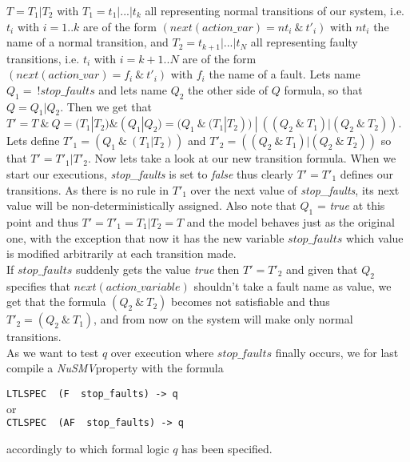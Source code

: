 \documentclass[12pt]{article}
\newcommand{\nusmv}{\mbox{\textit{NuSMV}}}
\begin{document}
$T = T_1 | T_2$ with $T_1 = t_1 | ... | t_k$ all representing normal transitions of our system, i.e. $t_i$ with $i=1..k$ are of the form $(next(action\_var) = nt_i~\&~t'_i)$ with $nt_i$ the name of a normal transition, and $T_2 = t_{k+1} | ... | t_N$ all representing faulty transitions, i.e. $t_i$ with $i=k+1..N$ are of the form $(next(action\_var) = f_i~\&~t'_i)$ with $f_i$ the name of a fault. Lets name $Q_1 =~!stop\_faults$ and lets name $Q_2$ the other side of $Q$ formula, so that $Q = Q_1 | Q_2$.
Then we get that $T' = T ~\&~ Q = (T_1|T_2) \& (Q_1|Q_2) = (Q_1~\&~(T_1|T_2)) ~|~ ((Q_2~\&~T_1) | (Q_2~\&~T_2))$. Lets define $T'_1 = (Q_1~\&~(T_1|T_2))$ and $T'_2 = ((Q_2~\&~T_1) | (Q_2~\&~T_2))$ so that $T' = T'_1 | T'_2$. Now lets take a look at our new transition formula. When we start our executions, \textit{stop\_faults} is set to \textit{false} thus clearly $T' = T'_1$ defines our transitions. As there is no rule in $T'_1$ over the next value of \textit{stop\_faults}, its next value will be non-deterministically assigned. Also note that $Q_1$ = \textit{true} at this point and thus $T' = T'_1 = T_1 | T_2 = T$ and the model behaves just as the original one, with the exception that now it has the new variable $stop\_faults$ which value is modified arbitrarily at each transition made.\\
If $stop\_faults$ suddenly gets the value \textit{true} then $T' = T'_2$ and given that $Q_2$ specifies that $next(action\_variable)$ shouldn't take a fault name as value, we get that the formula $(Q_2~\&~ T_2)$ becomes not satisfiable and thus $T'_2 = (Q_2 ~\&~ T_1)$, and from now on the system will make only normal transitions.\\
As we want to test $q$ over execution where $stop\_faults$ finally occurs, we for last compile a \nusmv property with the formula
\begin{center}
\texttt{LTLSPEC~ (F ~stop\_faults) -> q}\\
or\\
\texttt{CTLSPEC ~(AF~ stop\_faults) -> q}
\end{center} 
accordingly to which formal logic $q$ has been specified.
\end{document}
